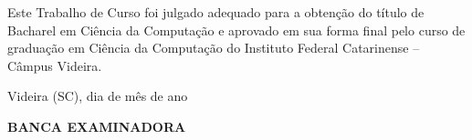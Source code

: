 \begin{folhadeaprovacao}

  \begin{center}
  \vspace*{-1.2cm}
    \textbf{\large\imprimirautor}
    
    \vspace*{\fill}\vspace*{\fill}\vspace*{\fill}
    \parbox{15cm}{
        \OnehalfSpacing\centering\large\textbf{\imprimirtitulo}
    }
    \vspace*{\fill}\vspace*{\fill}
    
    \hspace{.45\textwidth}
    \begin{minipage}{.5\textwidth}
        Este Trabalho de Curso foi julgado
        adequado para a obtenção do título de
        Bacharel em Ciência da Computação e
        aprovado em sua forma final pelo curso de
        graduação em Ciência da Computação do Instituto Federal Catarinense
        – Câmpus Videira. 

    \end{minipage}%
    \vspace*{\fill}
   \end{center}
    \vspace{-1cm}
  \begin{center}
  	 Videira (SC), dia de mês de ano
  \end{center}
  


  
   			  
    \begin{center}
  	\textbf{ BANCA EXAMINADORA}
   \end{center}
    

    \vspace*{1cm}
  
\end{folhadeaprovacao}